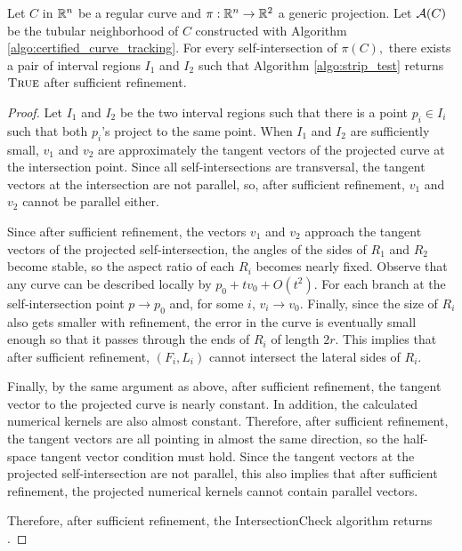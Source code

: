 \begin{lemma}
    Let $C$ in ${\mathbb R}^n$ be a regular curve and $\pi: {\mathbb R}^n \to {\mathbb R}^2$ a generic projection. Let ${\mathcal A}(C)$ be the tubular neighborhood of $C$ constructed with Algorithm \ref{algo:certified_curve_tracking}. For every self-intersection of $\pi(C),$ there exists a pair of interval regions $I_1$ and $I_2$ such that Algorithm \ref{algo:strip_test} returns $\textnormal{\textsc{True}}$ after sufficient refinement.
\end{lemma}
\begin{proof}
Let $I_1$ and $I_2$ be the two interval regions such that there is a point $p_i\in I_i$ such that both $p_i$'s project to the same point.  When $I_1$ and $I_2$ are sufficiently small, $v_1$ and $v_2$ are approximately the tangent vectors of the projected curve at the intersection point.  Since all self-intersections are transversal, the tangent vectors at the intersection are not parallel, so, after sufficient refinement, $v_1$ and $v_2$ cannot be parallel either.

Since after sufficient refinement, the vectors $v_1$ and $v_2$ approach the tangent vectors of the projected self-intersection, the angles of the sides of $R_1$ and $R_2$ become stable, so the aspect ratio of each $R_i$ becomes nearly fixed.  Observe that any curve can be described locally by $p_0+tv_0+O(t^2)$.  For each branch at the self-intersection point $p\rightarrow p_0$ and, for some $i$, $v_i\rightarrow v_0$.  Finally, since the size of $R_i$ also gets smaller with refinement, the error in the curve is eventually small enough so that it passes through the ends of $R_i$ of length $2r$.  This implies that after sufficient refinement, $(F_i,L_i)$ cannot intersect the lateral sides of $R_i$.

Finally, by the same argument as above, after sufficient refinement, the tangent vector to the projected curve is nearly constant.  In addition, the calculated numerical kernels are also almost constant.  Therefore, after sufficient refinement, the tangent vectors are all pointing in almost the same direction, so the half-space tangent vector condition must hold.  Since the tangent vectors at the projected self-intersection are not parallel, this also implies that after sufficient refinement, the projected numerical kernels cannot contain parallel vectors.  

Therefore, after sufficient refinement, the IntersectionCheck algorithm returns \true.
\end{proof}



